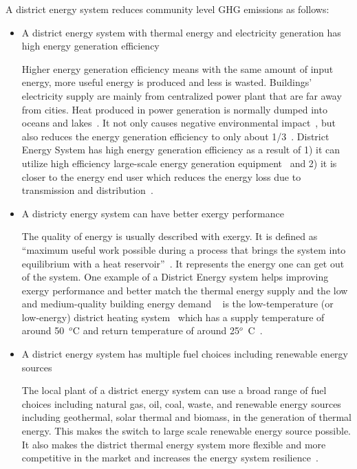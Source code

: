 A district energy system reduces community level GHG emissions as
follows:
\begin{itemize}
\item A district energy system with thermal energy and electricity
  generation has high energy generation efficiency

  Higher energy generation efficiency means with the same amount of
  input energy, more useful energy is produced and less is
  wasted. Buildings' electricity supply are mainly from centralized
  power plant that are far away from cities. Heat produced in power
  generation is normally dumped into oceans and lakes~\cite{baird2014,
    IDEA2012}. It not only causes negative environmental
  impact~\cite{wasteHeatEnviron}, but also reduces the energy
  generation efficiency to only about 1/3~\cite{IDEA2012}. District
  Energy System has high energy generation efficiency as a result of
  1) it can utilize high efficiency large-scale energy generation
  equipment~\cite{IDEA2005} and 2) it is closer to the energy end user
  which reduces the energy loss due to transmission and
  distribution~\cite{IDEA2012}.

\item A districty energy system can have better exergy performance 

  The quality of energy is usually described with exergy. It is
  defined as ``maximum useful work possible during a process that
  brings the system into equilibrium with a heat
  reservoir''~\cite{exergyWiki2015}. It represents the energy one can
  get out of the system. One example of a District Energy system helps
  improving exergy performance and better match the thermal energy
  supply and the low and medium-quality building energy demand
  ~\cite{Dobbelsteen2013} is the low-temperature (or low-energy)
  district heating system~\cite{Tol2012551} which has a supply
  temperature of around 50~$^o$C and return temperature of around
  25$^o$~C~\cite{Tol2012551}.

\item A district energy system has multiple fuel choices including
  renewable energy sources

  The local plant of a district energy system can use a broad range
  of fuel choices including natural gas, oil, coal, waste, and
  renewable energy sources including geothermal, solar thermal and
  biomass, in the generation of thermal energy. This makes the switch
  to large scale renewable energy source possible. It also makes the
  district thermal energy system more flexible and more competitive in
  the market and increases the energy system
  resilience~\cite{IDEA2005, IDEA2012}.

\end{itemize}

